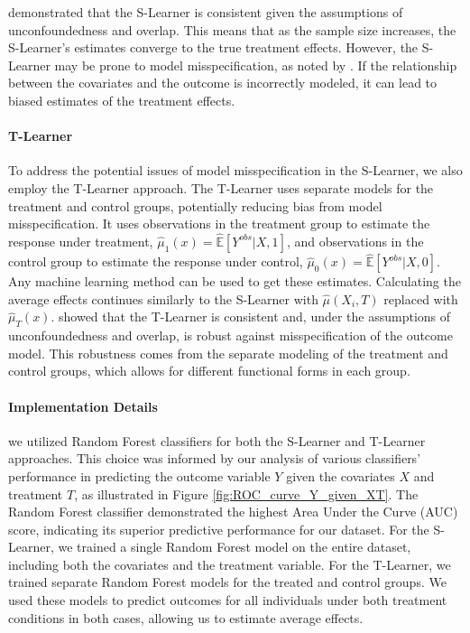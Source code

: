 \documentclass{article}
\begin{document}
\citet{hahn1998role} demonstrated that the S-Learner is consistent given the assumptions of unconfoundedness and overlap. This means that as the sample size increases, the S-Learner's estimates converge to the true treatment effects.
However, the S-Learner may be prone to model misspecification, as noted by \citet{rubin1979using}. If the relationship between the covariates and the outcome is incorrectly modeled, it can lead to biased estimates of the treatment effects.
\paragraph{T-Learner} To address the potential issues of model misspecification in the S-Learner, we also employ the T-Learner approach. The T-Learner uses separate models for the treatment and control groups, potentially reducing bias from model misspecification. It uses observations in the treatment group to estimate the response under treatment, $\hat\mu_1(x) = \hat{\mathbb{E}}[Y^{obs} | X, 1]$, and observations in the control group to estimate the response under control, $\hat\mu_0(x) = \hat{\mathbb{E}}[Y^{obs} | X, 0]$. Any machine learning method can be used to get these estimates. Calculating the average effects continues similarly to the S-Learner with $\hat \mu (X_i, T)$ replaced with $\hat \mu_T(x)$.
\citet{greenland1986identifiability} showed that the T-Learner is consistent and, under the assumptions of unconfoundedness and overlap, is robust against misspecification of the outcome model. This robustness comes from the separate modeling of the treatment and control groups, which allows for different functional forms in each group.

\paragraph{Implementation Details}  we utilized Random Forest classifiers for both the S-Learner and T-Learner approaches. This choice was informed by our analysis of various classifiers' performance in predicting the outcome variable $Y$ given the covariates $X$ and treatment $T$, as illustrated in Figure \ref{fig:ROC_curve_Y_given_XT}. The Random Forest classifier demonstrated the highest Area Under the Curve (AUC) score, indicating its superior predictive performance for our dataset.
For the S-Learner, we trained a single Random Forest model on the entire dataset, including both the covariates and the treatment variable. For the T-Learner, we trained separate Random Forest models for the treated and control groups. We used these models to predict outcomes for all individuals under both treatment conditions in both cases, allowing us to estimate average effects.
\end{document}
